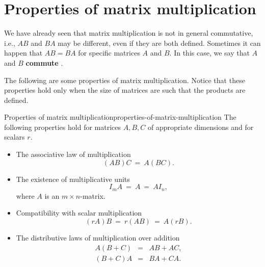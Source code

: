 \section{Properties of matrix multiplication}

We have already seen that matrix multiplication is not in general
commutative, i.e., $AB$ and $BA$ may be different, even if they are
both defined. Sometimes it can happen that $AB=BA$ for specific
matrices $A$ and $B$. In this case, we say that $A$ and $B$
\textbf{commute}%
.

The following are some properties of matrix multiplication.  Notice
that these properties hold only when the size of matrices are such
that the products are defined.

\begin{theorem}{Properties of matrix multiplication}{properties-of-matrix-multiplication}
  The following properties hold%
   for matrices $A,B,C$
  of appropriate dimensions and for scalars $r$.
  \begin{itemize}
  \item The associative law of multiplication
    \begin{equation*}
      (AB)C ~=~ A(BC).
    \end{equation*}
  \item The existence of multiplicative units
    \begin{equation*}
      I_mA ~=~ A ~=~ AI_n,
    \end{equation*}
    where $A$ is an $m\times n$-matrix.
  \item Compatibility with scalar multiplication
    \begin{equation*}
      (rA)B ~=~ r(AB) ~=~ A(rB).
    \end{equation*}
  \item The distributive laws of multiplication over addition
    \begin{eqnarray*}
      A(B+C) &=& AB + AC, \\
      (B+C)A &=& BA + CA.
    \end{eqnarray*}
  \end{itemize}
\end{theorem}


